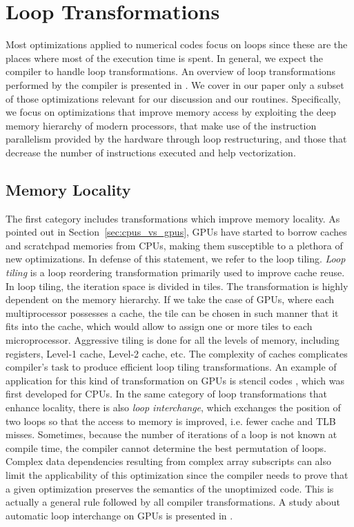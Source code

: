 \section{Loop Transformations}
\label{sec:optimizations}

Most optimizations applied to numerical codes focus on loops since these are the
places where most of the execution time is spent. In general, we expect the
compiler to handle loop transformations. An overview of loop transformations
performed by the compiler is presented in \cite{Bacon:1994:CTH:197405.197406}.
We cover in our paper only a subset of those optimizations relevant for our
discussion and our routines. Specifically, we focus on optimizations that
improve memory access by exploiting the deep memory hierarchy of modern
processors, that make use of the instruction parallelism provided by the
hardware through loop restructuring, and those that decrease the number of
instructions executed and help vectorization.

\subsection{Memory Locality}

The first category includes transformations which improve memory locality. As
pointed out in Section~\ref{sec:cpus_vs_gpus}, GPUs have started to borrow
caches and scratchpad memories from CPUs, making them susceptible to a plethora
of new optimizations. In defense of this statement, we refer to the loop tiling.
\textit{Loop tiling} is a loop reordering transformation primarily used to
improve cache reuse. In loop tiling, the iteration space is divided in tiles.
The transformation is highly dependent on the memory hierarchy. If we take the
case of GPUs, where each multiprocessor possesses a cache, the tile can be
chosen in such manner that it fits into the cache, which would allow to assign
one or more tiles to each microprocessor. Aggressive tiling is done for all the
levels of memory, including registers, Level-1 cache, Level-2 cache, etc. The
complexity of caches complicates compiler's task to produce efficient loop
tiling transformations. An example of application for this kind of
transformation on GPUs is stencil codes \cite{volkov2010}, which was first
developed for CPUs. In the same category of loop transformations that enhance
locality, there is also \textit{loop interchange}, which exchanges the position
of two loops so that the access to memory is improved, i.e. fewer cache and TLB
misses. Sometimes, because the number of iterations of a loop is not known at
compile time, the compiler cannot determine the best permutation of loops.
Complex data dependencies resulting from complex array subscripts can also limit
the applicability of this optimization since the compiler needs to prove that a
given optimization preserves the semantics of the unoptimized code. This is
actually a general rule followed by all compiler transformations. A study about
automatic loop interchange on GPUs is presented in
\cite{Leung:2009:APG:1596655.1596670}.

